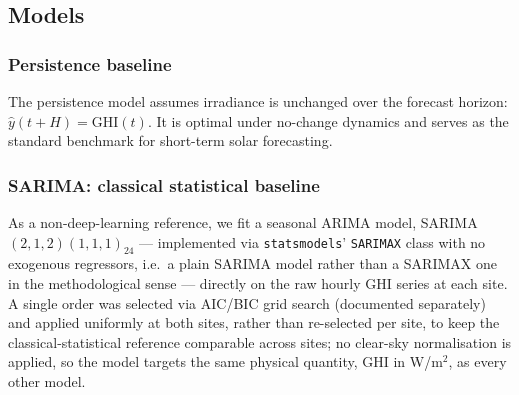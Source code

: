 \subsection{Models}

\subsubsection{Persistence baseline}

The persistence model assumes irradiance is unchanged over the forecast horizon:
$\hat{y}(t+H) = \text{GHI}(t)$. It is optimal under no-change dynamics and
serves as the standard benchmark for short-term solar forecasting.

\subsubsection{SARIMA: classical statistical baseline}
\label{ssec:sarima}

As a non-deep-learning reference, we fit a seasonal ARIMA model,
SARIMA$(2,1,2)(1,1,1)_{24}$ --- implemented via \texttt{statsmodels}'
\texttt{SARIMAX} class with no exogenous regressors, i.e.\ a plain SARIMA
model rather than a SARIMAX one in the methodological sense --- directly on
the raw hourly GHI series at each site. A single order was selected via AIC/BIC grid search (documented
separately) and applied uniformly at both sites, rather than re-selected
per site, to keep the classical-statistical reference comparable across
sites; no clear-sky normalisation is applied, so the model targets the same
physical quantity, GHI in W/m$^2$, as every other model.

